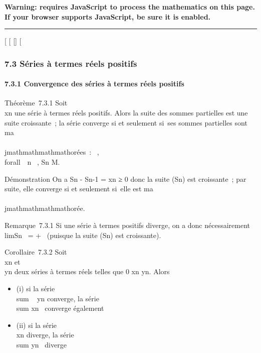 \textbf{Warning: 
requires JavaScript to process the mathematics on this page.\\ If your
browser supports JavaScript, be sure it is enabled.}

\begin{center}\rule{3in}{0.4pt}\end{center}

{[}
{[}
{[}{]}
{[}

\subsubsection{7.3 Séries à termes réels positifs}

\paragraph{7.3.1 Convergence des séries à termes réels positifs}

Théorème~7.3.1 Soit \\\sum
 xn une série à termes réels positifs. Alors la suite des
sommes partielles est une suite croissante~; la série converge si et
seulement si~ses sommes partielles sont ma\\\\jmathmathmathmathorées~:
\existsM \in {}~, \\forall~~n \in {}~,
Sn \leq M.

Démonstration On a Sn - Sn-1 = xn ≥ 0 donc
la suite (Sn) est croissante~; par suite, elle converge si et
seulement si~elle est ma\\\\jmathmathmathmathorée.

Remarque~7.3.1 Si une série à termes positifs diverge, on a donc
nécessairement limSn~ = +\infty~ (puisque
la suite (Sn) est croissante).

Corollaire~7.3.2 Soit \\\sum
 xn et \\\sum
 yn deux séries à termes réels telles que 0 \leq xn
\leq yn. Alors

\begin{itemize}
\itemsep1pt\parskip0pt
\item
  (i) si la série \\sum ~
  yn converge, la série
  \\sum  xn~
  converge également
\item
  (ii) si la série \\\sum
   xn diverge, la série
  \\sum  yn~
  diverge
\end{itemize}

